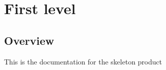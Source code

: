 \hypertarget{index_First_level}{}\section{First level                                        }\label{index_First_level}
\hypertarget{index_Overview}{}\subsection{Overview}\label{index_Overview}
This is the documentation for the skeleton product 